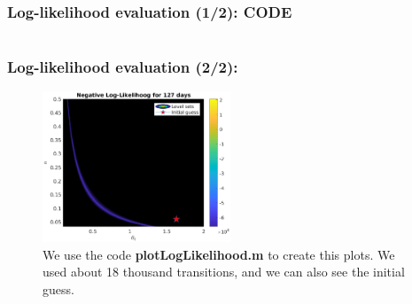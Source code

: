 \documentclass[aspectratio=169]{beamer}\usepackage[utf8]{inputenc}
\begin{document}
\begin{frame}\frametitle{Log-likelihood evaluation (1/2): CODE}

\begin{center}
\begin{tabular}{|c|}
\toprule
{\tiny

}\\
\bottomrule
\end{tabular}
\end{center}

\end{frame}


\begin{frame}\frametitle{Log-likelihood evaluation (2/2):}

\begin{figure}[ht!]
\centering
\includegraphics[width=0.5\textwidth]{../Results/likelihood/normal/Log-Likelihood.eps}
\caption{We use the code \textbf{plotLogLikelihood.m} to create this plots. We used about 18 thousand transitions, and we can also see the initial guess.}
\end{figure}

\end{frame}
\end{document}
